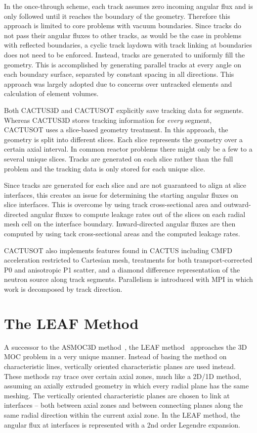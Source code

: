 In the once-through scheme, each track assumes zero incoming angular flux and is only followed until it reaches the boundary of the geometry. Therefore this approach is limited to core problems with vacuum boundaries. Since tracks do not pass their angular fluxes to other tracks, as would be the case in problems with reflected boundaries, a cyclic track laydown with track linking at boundaries does not need to be enforced. Instead, tracks are generated to uniformly fill the geometry. This is accomplished by generating parallel tracks at every angle on each boundary surface, separated by constant spacing in all directions. This approach was largely adopted due to concerns over untracked elements and calculation of element volumes.

Both CACTUS3D and CACTUSOT explicitly save tracking data for segments. Whereas CACTUS3D stores tracking information for \textit{every} segment, CACTUSOT uses a slice-based geometry treatment. In this approach, the geometry is split into different slices. Each slice represents the geometry over a certain axial interval. In common reactor problems there might only be a few to a several unique slices. Tracks are generated on each slice rather than the full problem and the tracking data is only stored for each unique slice. 

Since tracks are generated for each slice and are not guaranteed to align at slice interfaces, this creates an issue for determining the starting angular fluxes on slice interfaces. This is overcome by using track cross-sectional area and outward-directed angular fluxes to compute leakage rates out of the slices on each radial mesh cell on the interface boundary. Inward-directed angular fluxes are then computed by using tack cross-sectional areas and the computed leakage rates.

CACTUSOT also implements features found in CACTUS including \ac{CMFD} acceleration restricted to Cartesian mesh, treatments for both transport-corrected P0 and anisotropic P1 scatter, and a diamond difference representation of the neutron source along track segments. Parallelism is introduced with \ac{MPI} in which work is decomposed by track direction.


\section{The LEAF Method}
\label{sec:leaf}

A successor to the ASMOC3D method~\cite{pre_leaf}, the LEAF method~\cite{leaf_init, leaf_method} approaches the 3D \ac{MOC} problem in a very unique manner. Instead of basing the method on characteristic lines, vertically oriented characteristic planes are used instead. These methods ray trace over certain axial zones, much like a 2D/1D method, assuming an axially extruded geometry in which every radial plane has the same meshing. The vertically oriented characteristic planes are chosen to link at interfaces -- both between axial zones and between connecting planes along the same radial direction within the current axial zone. In the LEAF method, the angular flux at interfaces is represented with a 2nd order Legendre expansion.

